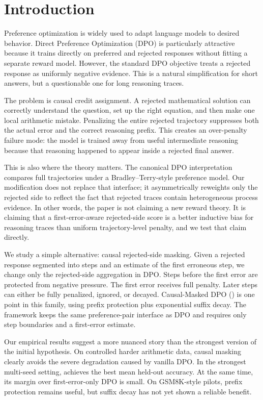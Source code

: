 \section{Introduction}

Preference optimization is widely used to adapt language models to desired behavior. Direct Preference Optimization (DPO) \citep{rafailov2023direct} is particularly attractive because it trains directly on preferred and rejected responses without fitting a separate reward model. However, the standard DPO objective treats a rejected response as uniformly negative evidence. This is a natural simplification for short answers, but a questionable one for long reasoning traces.

The problem is causal credit assignment. A rejected mathematical solution can correctly understand the question, set up the right equation, and then make one local arithmetic mistake. Penalizing the entire rejected trajectory suppresses both the actual error and the correct reasoning prefix. This creates an over-penalty failure mode: the model is trained away from useful intermediate reasoning because that reasoning happened to appear inside a rejected final answer.

This is also where the theory matters. The canonical DPO interpretation compares full trajectories under a Bradley--Terry-style preference model. Our modification does not replace that interface; it asymmetrically reweights only the rejected side to reflect the fact that rejected traces contain heterogeneous process evidence. In other words, the paper is not claiming a new reward theory. It is claiming that a first-error-aware rejected-side score is a better inductive bias for reasoning traces than uniform trajectory-level penalty, and we test that claim directly.

We study a simple alternative: causal rejected-side masking. Given a rejected response segmented into steps and an estimate of the first erroneous step, we change only the rejected-side aggregation in DPO. Steps before the first error are protected from negative pressure. The first error receives full penalty. Later steps can either be fully penalized, ignored, or decayed. Causal-Masked DPO (\cmdpo) is one point in this family, using prefix protection plus exponential suffix decay. The framework keeps the same preference-pair interface as DPO and requires only step boundaries and a first-error estimate.

Our empirical results suggest a more nuanced story than the strongest version of the initial hypothesis. On controlled harder arithmetic data, causal masking clearly avoids the severe degradation caused by vanilla DPO. In the strongest multi-seed setting, \cmdpo{} achieves the best mean held-out accuracy. At the same time, its margin over first-error-only DPO is small. On GSM8K-style pilots, prefix protection remains useful, but suffix decay has not yet shown a reliable benefit.


